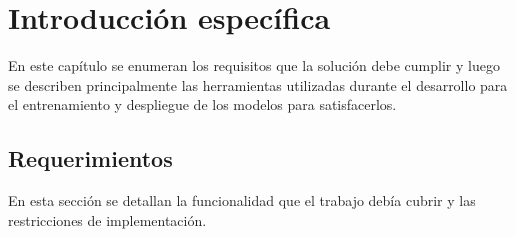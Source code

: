 \chapter{Introducción específica} %

\label{Chapter2}

En este capítulo se enumeran los requisitos que la solución debe cumplir y luego se describen principalmente las herramientas utilizadas durante el desarrollo para el entrenamiento y despliegue de los modelos para satisfacerlos.

\section{Requerimientos}

En esta sección se detallan la funcionalidad que el trabajo debía cubrir y las restricciones de implementación.


